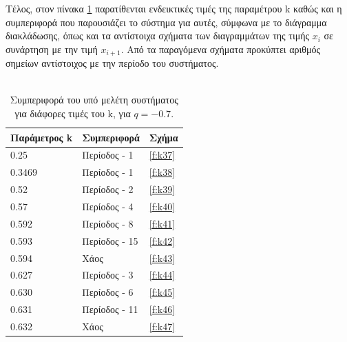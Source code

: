 Τέλος, στον πίνακα \ref{tab:abc3} παρατίθενται ενδεικτικές τιμές της παραμέτρου k καθώς και η συμπεριφορά που παρουσιάζει το σύστημα για αυτές, σύμφωνα με το διάγραμμα διακλάδωσης, όπως και τα αντίστοιχα σχήματα των διαγραμμάτων της τιμής \(x_i\) σε συνάρτηση με την τιμή \(x_{i+1}\). Από τα παραγόμενα σχήματα προκύπτει αριθμός σημείων αντίστοιχος με την περίοδο του συστήματος.\\\\

\begin{table}[ht]
	\centering
	\caption{ Συμπεριφορά του υπό μελέτη συστήματος για διάφορες τιμές του k, για $q=-0.7$.}
	\label{tab:abc3}
	\begin{tabular}{l | l | l}
		Παράμετρος k & Συμπεριφορά & Σχήμα\\
		\hline
		0.25 &  Περίοδος -  1 & \ref{f:k37}\\
		0.3469&  Περίοδος -  1 & \ref{f:k38}\\
		0.52& Περίοδος -  2 & \ref{f:k39}\\
		0.57& Περίοδος -  4 & \ref{f:k40}\\
		0.592 &  Περίοδος -  8 & \ref{f:k41}\\
		0.593& Περίοδος -  15 & \ref{f:k42}\\
		0.594 & Χάος & \ref{f:k43}\\
		0.627 & Περίοδος -  3 & \ref{f:k44}\\
		0.630 & Περίοδος -  6 & \ref{f:k45}\\
		0.631 & Περίοδος -  11 & \ref{f:k46}\\
		0.632 & Χάος & \ref{f:k47}\\
	\end{tabular}
	
\end{table}

